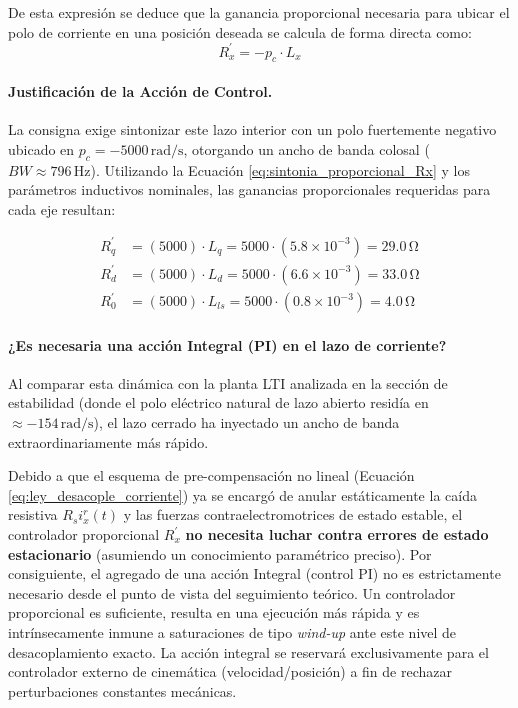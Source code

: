 \documentclass[10pt,a4paper]{article}
\begin{document}
De esta expresión se deduce que la ganancia proporcional necesaria para ubicar el polo de corriente en una posición deseada se calcula de forma directa como:
\begin{equation}
    R_x^\prime = -p_c \cdot L_x
    \label{eq:sintonia_proporcional_Rx}
\end{equation}

\paragraph{Justificación de la Acción de Control.}
La consigna exige sintonizar este lazo interior con un polo fuertemente negativo ubicado en $p_c = -5000\,\text{rad/s}$, otorgando un ancho de banda colosal ($BW \approx 796\,\text{Hz}$). Utilizando la Ecuación \eqref{eq:sintonia_proporcional_Rx} y los parámetros inductivos nominales, las ganancias proporcionales requeridas para cada eje resultan:

\begin{align*}
    R_q^\prime &= (5000)\cdot L_q = 5000 \cdot (5.8 \times 10^{-3}) = 29.0\,\si{\ohm} \\
    R_d^\prime &= (5000)\cdot L_d = 5000 \cdot (6.6 \times 10^{-3}) = 33.0\,\si{\ohm} \\
    R_0^\prime &= (5000)\cdot L_{ls} = 5000 \cdot (0.8 \times 10^{-3}) = 4.0\,\si{\ohm}
\end{align*}

\paragraph{¿Es necesaria una acción Integral (PI) en el lazo de corriente?}
Al comparar esta dinámica con la planta LTI analizada en la sección de estabilidad (donde el polo eléctrico natural de lazo abierto residía en $\approx -154\,\text{rad/s}$), el lazo cerrado ha inyectado un ancho de banda extraordinariamente más rápido. 

Debido a que el esquema de pre-compensación no lineal (Ecuación \eqref{eq:ley_desacople_corriente}) ya se encargó de anular estáticamente la caída resistiva $R_s i_x^r(t)$ y las fuerzas contraelectromotrices de estado estable, el controlador proporcional $R_x^\prime$ \textbf{no necesita luchar contra errores de estado estacionario} (asumiendo un conocimiento paramétrico preciso). Por consiguiente, el agregado de una acción Integral (control PI) no es estrictamente necesario desde el punto de vista del seguimiento teórico. Un controlador proporcional es suficiente, resulta en una ejecución más rápida y es intrínsecamente inmune a saturaciones de tipo \textit{wind-up} ante este nivel de desacoplamiento exacto. La acción integral se reservará exclusivamente para el controlador externo de cinemática (velocidad/posición) a fin de rechazar perturbaciones constantes mecánicas.
\end{document}
